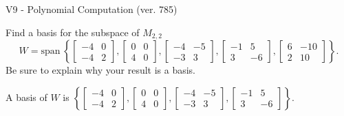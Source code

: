 \begin{exercise}
  \begin{exerciseTitle}V9 - Polynomial Computation (ver. 785)\end{exerciseTitle}
  \begin{exerciseStatement}
    Find a basis for the subspace of \(M_{2,2}\) 
\[W=\mathrm{span}\ \left\{\left[\begin{array}{cc}
-4 & 0 \\
-4 & 2
\end{array}\right] , \left[\begin{array}{cc}
0 & 0 \\
4 & 0
\end{array}\right] , \left[\begin{array}{cc}
-4 & -5 \\
-3 & 3
\end{array}\right] , \left[\begin{array}{cc}
-1 & 5 \\
3 & -6
\end{array}\right] , \left[\begin{array}{cc}
6 & -10 \\
2 & 10
\end{array}\right]\right\}.\]
 Be sure to explain why your result is a basis.


  \end{exerciseStatement}
  \begin{exerciseAnswer}
   A basis of \(W\) is  \(\left\{\left[\begin{array}{cc}
-4 & 0 \\
-4 & 2
\end{array}\right] , \left[\begin{array}{cc}
0 & 0 \\
4 & 0
\end{array}\right] , \left[\begin{array}{cc}
-4 & -5 \\
-3 & 3
\end{array}\right] , \left[\begin{array}{cc}
-1 & 5 \\
3 & -6
\end{array}\right]\right\}\).
  


  \end{exerciseAnswer}
\end{exercise}